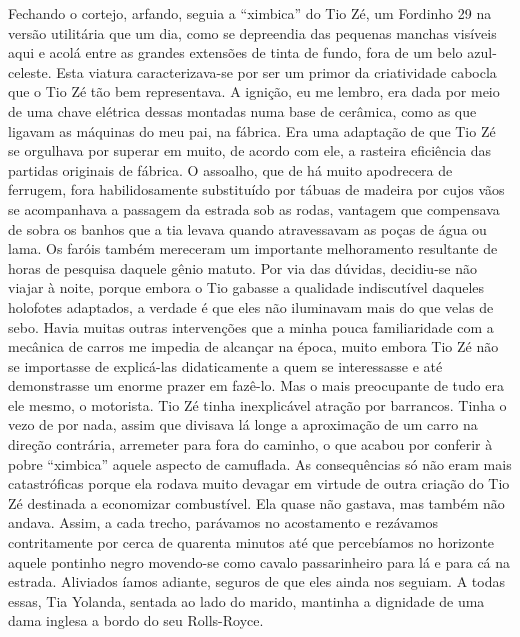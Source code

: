 Fechando o cortejo, arfando, seguia a ``ximbica'' do Tio Zé, um Fordinho 29 na versão utilitária que um dia, como se depreendia das pequenas manchas visíveis aqui e acolá entre as grandes extensões de tinta de fundo, fora de um belo azul-celeste.
Esta viatura caracterizava-se por ser um primor da criatividade cabocla que o Tio Zé tão bem representava.
A ignição, eu me lembro, era dada por meio de uma chave elétrica dessas montadas numa base de cerâmica, como as que ligavam as máquinas do meu pai, na fábrica.
Era uma adaptação de que Tio Zé se orgulhava por superar em muito, de acordo com ele, a rasteira eficiência das partidas originais de fábrica.
O assoalho, que de há muito apodrecera de ferrugem, fora habilidosamente substituído por tábuas de madeira por cujos vãos se acompanhava a passagem da estrada sob as rodas, vantagem que compensava de sobra os banhos que a tia levava quando atravessavam as poças de água ou lama.
Os faróis também mereceram um importante melhoramento resultante de horas de pesquisa daquele gênio matuto.
Por via das dúvidas, decidiu-se não viajar à noite, porque embora o Tio gabasse a qualidade indiscutível daqueles holofotes adaptados, a verdade é que eles não iluminavam mais do que velas de sebo.
Havia muitas outras intervenções que a minha pouca familiaridade com a mecânica de carros me impedia de alcançar na época, muito embora Tio Zé não se importasse de explicá-las didaticamente a quem se interessasse e até demonstrasse um enorme prazer em fazê-lo.
Mas o mais preocupante de tudo era ele mesmo, o motorista.
Tio Zé tinha inexplicável atração por barrancos.
Tinha o vezo de por nada, assim que divisava lá longe a aproximação de um carro na direção contrária, arremeter para fora do caminho, o que acabou por conferir à pobre ``ximbica'' aquele aspecto de camuflada.
As consequências só não eram mais catastróficas porque ela rodava muito devagar em virtude de outra criação do Tio Zé destinada a economizar combustível.
Ela quase não gastava, mas também não andava.
Assim, a cada trecho, parávamos no acostamento e rezávamos contritamente por cerca de quarenta minutos até que percebíamos no horizonte aquele pontinho negro movendo-se como cavalo passarinheiro para lá e para cá na estrada.
Aliviados íamos adiante, seguros de que eles ainda nos seguiam.
A todas essas, Tia Yolanda, sentada ao lado do marido, mantinha a dignidade de uma dama inglesa a bordo do seu Rolls-Royce.

